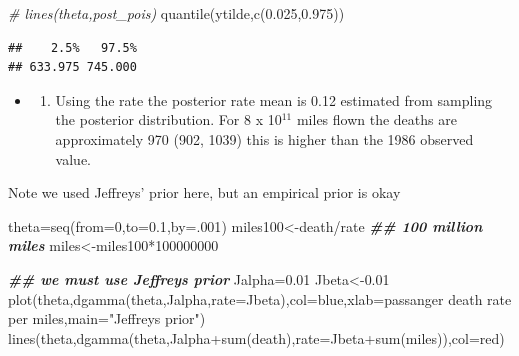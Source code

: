 \documentclass[
]{book}
\newenvironment{Shaded}{\begin{snugshade}}{\end{snugshade}}
\newcommand{\AttributeTok}[1]{\textcolor[rgb]{0.77,0.63,0.00}{#1}}
\newcommand{\CommentTok}[1]{\textcolor[rgb]{0.56,0.35,0.01}{\textit{#1}}}
\newcommand{\DecValTok}[1]{\textcolor[rgb]{0.00,0.00,0.81}{#1}}
\newcommand{\DocumentationTok}[1]{\textcolor[rgb]{0.56,0.35,0.01}{\textbf{\textit{#1}}}}
\newcommand{\FloatTok}[1]{\textcolor[rgb]{0.00,0.00,0.81}{#1}}
\newcommand{\FunctionTok}[1]{\textcolor[rgb]{0.00,0.00,0.00}{#1}}
\newcommand{\NormalTok}[1]{#1}
\newcommand{\OtherTok}[1]{\textcolor[rgb]{0.56,0.35,0.01}{#1}}
\newcommand{\SpecialCharTok}[1]{\textcolor[rgb]{0.00,0.00,0.00}{#1}}
\newcommand{\StringTok}[1]{\textcolor[rgb]{0.31,0.60,0.02}{#1}}
\providecommand{\tightlist}{%
  \setlength{\itemsep}{0pt}\setlength{\parskip}{0pt}}
\theoremstyle{definition}
\theoremstyle{definition}
\theoremstyle{definition}
\theoremstyle{definition}
\theoremstyle{remark}
\begin{document}
\begin{Shaded}
\begin{Highlighting}[]
\CommentTok{\# lines(theta,post\_pois)}
 \FunctionTok{quantile}\NormalTok{(ytilde,}\FunctionTok{c}\NormalTok{(}\FloatTok{0.025}\NormalTok{,}\FloatTok{0.975}\NormalTok{))}
\end{Highlighting}
\end{Shaded}

\begin{verbatim}
##    2.5%   97.5% 
## 633.975 745.000
\end{verbatim}

\begin{itemize}
\item
  \begin{enumerate}
  \def\labelenumi{(\alph{enumi})}
  \setcounter{enumi}{3}
  \tightlist
  \item
    Using the rate the posterior rate mean is 0.12 estimated from sampling the posterior distribution. For 8 x 10\(^11\) miles flown the deaths are approximately 970 (902, 1039) this is higher than the 1986 observed value.
  \end{enumerate}
\end{itemize}

Note we used Jeffreys' prior here, but an empirical prior is okay

\begin{Shaded}
\begin{Highlighting}[]
\NormalTok{  theta}\OtherTok{=}\FunctionTok{seq}\NormalTok{(}\AttributeTok{from=}\DecValTok{0}\NormalTok{,}\AttributeTok{to=}\FloatTok{0.1}\NormalTok{,}\AttributeTok{by=}\NormalTok{.}\DecValTok{001}\NormalTok{)}
\NormalTok{ miles100}\OtherTok{\textless{}{-}}\NormalTok{death}\SpecialCharTok{/}\NormalTok{rate }\DocumentationTok{\#\# 100 million miles}
\NormalTok{ miles}\OtherTok{\textless{}{-}}\NormalTok{miles100}\SpecialCharTok{*}\DecValTok{100000000}

 


   
  \DocumentationTok{\#\# we must use Jeffreys\textquotesingle{} prior}
\NormalTok{    Jalpha}\OtherTok{=}\FloatTok{0.01}
\NormalTok{  Jbeta}\OtherTok{\textless{}{-}}\FloatTok{0.01}
 \FunctionTok{plot}\NormalTok{(theta,}\FunctionTok{dgamma}\NormalTok{(theta,Jalpha,}\AttributeTok{rate=}\NormalTok{Jbeta),}\AttributeTok{col=}\StringTok{\textquotesingle{}blue\textquotesingle{}}\NormalTok{,}\AttributeTok{xlab=}\StringTok{\textquotesingle{}passanger death rate per miles\textquotesingle{}}\NormalTok{,}\AttributeTok{main=}\StringTok{"Jeffreys\textquotesingle{} prior"}\NormalTok{)}
\FunctionTok{lines}\NormalTok{(theta,}\FunctionTok{dgamma}\NormalTok{(theta,Jalpha}\SpecialCharTok{+}\FunctionTok{sum}\NormalTok{(death),}\AttributeTok{rate=}\NormalTok{Jbeta}\SpecialCharTok{+}\FunctionTok{sum}\NormalTok{(miles)),}\AttributeTok{col=}\StringTok{\textquotesingle{}red\textquotesingle{}}\NormalTok{)}
\end{Highlighting}
\end{Shaded}
\end{document}
